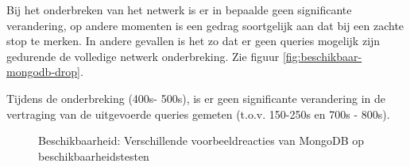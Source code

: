 Bij het onderbreken van het netwerk is er in bepaalde geen significante verandering, op andere momenten is een gedrag soortgelijk aan dat bij een zachte stop te merken. In andere gevallen is het zo dat er geen queries mogelijk zijn gedurende de volledige netwerk onderbreking. Zie figuur \ref{fig:beschikbaar-mongodb-drop}. 

Tijdens de onderbreking (400s- 500s), is er geen significante verandering in de vertraging van de uitgevoerde queries gemeten (t.o.v. 150-250s en 700s - 800s). 
 
\begin{figure}[ht!] 
	\centering
	\caption{Beschikbaarheid: Verschillende voorbeeldreacties van MongoDB op beschikbaarheidstesten }
	\label{fig:beschikbaar-mongodb-1}
\end{figure}

